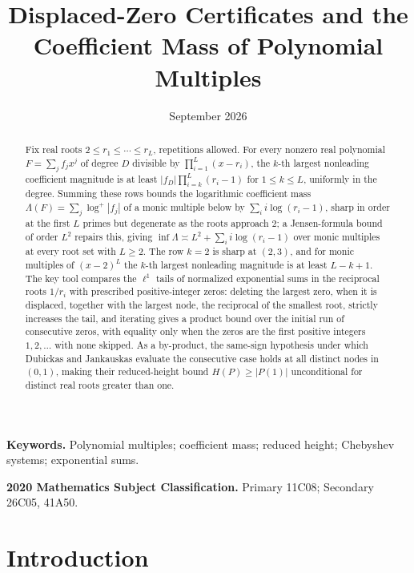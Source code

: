 \documentclass[11pt]{article}
\title{Displaced-Zero Certificates and the Coefficient Mass of Polynomial Multiples}
\author{\shortstack{Bangyen Pham\\
\small Independent Researcher\\
\small\href{mailto:bangyenp@gmail.com}{\texttt{bangyenp@gmail.com}}\\
\small\href{https://orcid.org/0009-0006-9928-2088}{ORCID: 0009-0006-9928-2088}}}
\date{September 2026}
\begin{document}
\maketitle

\begin{abstract}
Fix real roots $2\le r_1\le\cdots\le r_L$, repetitions allowed.  For every
nonzero real polynomial $F=\sum_jf_jx^j$ of degree $D$ divisible by
$\prod_{i=1}^L(x-r_i)$, the $k$-th largest nonleading coefficient
magnitude is at least $|f_D|\prod_{i=k}^L(r_i-1)$ for $1\le k\le L$,
uniformly in the degree.  Summing these rows bounds the logarithmic
coefficient mass $\Lambda(F)=\sum_j\log^+|f_j|$ of a monic multiple below by
$\sum_ii\log(r_i-1)$, sharp in order at the first $L$ primes but degenerate
as the roots approach $2$; a Jensen-formula bound of order $L^2$ repairs
this, giving $\inf\Lambda\asymp L^2+\sum_ii\log(r_i-1)$ over monic
multiples at every root set with $L\ge2$.  The row $k=2$ is
sharp at $(2,3)$, and for monic multiples of $(x-2)^L$ the $k$-th
largest nonleading magnitude is at least $L-k+1$.  The key tool compares the
$\ell^1$ tails of normalized exponential sums in the reciprocal roots
$1/r_i$ with prescribed positive-integer zeros: deleting the largest zero,
when it is displaced, together with the largest node, the reciprocal of
the smallest root, strictly increases the tail, and iterating gives a product bound over
the initial run of consecutive zeros, with equality only when the zeros are
the first positive integers $1,2,\ldots$ with none skipped.  As a by-product, the same-sign hypothesis under which
Dubickas and Jankauskas evaluate the consecutive case holds at all distinct
nodes in $(0,1)$, making their reduced-height bound $H(P)\ge|P(1)|$ unconditional for
distinct real roots greater than one.
\end{abstract}

\noindent\textbf{Keywords.} Polynomial multiples; coefficient mass; reduced
height; Chebyshev systems; exponential sums.

\noindent\textbf{2020 Mathematics Subject Classification.} Primary 11C08; Secondary 26C05, 41A50.

\section{Introduction}
\end{document}
